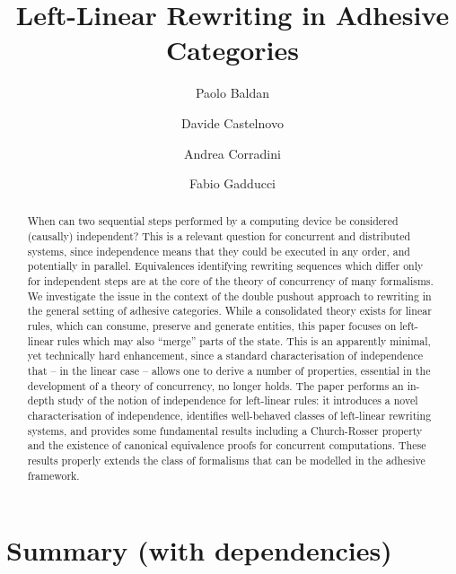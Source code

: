 \documentclass[a4paper,UKenglish,cleveref,pdftex,thm-restate,numberwithinsect]{lipics-v2021}
\author{Paolo Baldan} 
{Department of Mathematics, University of Padua, Italy}
{baldan@math.unipd.it}
{https://orcid.org/0000-0001-9357-5599}{}
\author{Davide Castelnovo}
{Department of Mathematics, University of Padua, Italy}
{davide.castelnovo@math.unipd.it}
{https://orcid.org/0000-0002-5926-5615}{}
\author{Andrea Corradini}
{Department of Computer Science, University of Pisa, Italy}
{andrea.corradini@unipi.it}
{https://orcid.org/0000-0001-6123-4175}{}
\author{Fabio Gadducci}
{Department of Computer Science, University of Pisa, Italy}
{fabio.gadducci@unipi.it}
{https://orcid.org/0000-0003-0690-3051}{}
\title{Left-Linear Rewriting in Adhesive Categories}
\begin{document}
\maketitle


\begin{abstract}
  When can two sequential steps performed by a computing device be
  considered (causally) independent?  This is a relevant question for
  concurrent and distributed systems, since independence means that
  they could be executed in any order, and potentially in
  parallel. Equivalences identifying rewriting sequences which differ
  only for independent steps are at the core of the theory of
  concurrency of many formalisms.
  We investigate the issue in the context of the double pushout
  approach to rewriting in the general setting of adhesive categories.
  While a consolidated theory exists for linear rules, which
  can consume, preserve and generate entities, this paper focuses on
  left-linear rules which may also ``merge'' parts of the state.  This is an apparently minimal, yet technically hard enhancement, 
  since %
  a standard characterisation of independence that -- in the
  linear case -- allows one to derive a number of properties,
  essential in the development of a theory of concurrency, no longer
  holds.
  The paper performs an in-depth study of the notion of independence
  for left-linear rules: it introduces a novel characterisation of
  independence, identifies well-behaved classes of left-linear
  rewriting systems, and provides some fundamental results including a
  Church-Rosser property and the existence of canonical equivalence
  proofs for concurrent computations. These results properly extends
  the class of formalisms that can be modelled in the adhesive
  framework.
\end{abstract}



\iffalse
\section*{Summary (with dependencies)}
\end{document}
